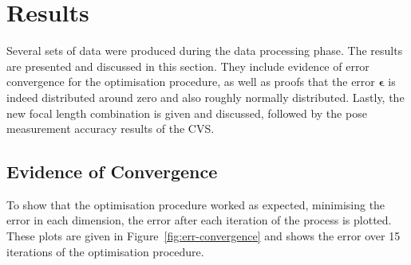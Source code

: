 \section{Results}

Several sets of data were produced during the data processing phase. The results are presented and discussed in this section. They include evidence of error convergence for the optimisation procedure, as well as proofs that the error $\bm{\epsilon}$ is indeed distributed around zero and also roughly normally distributed. Lastly, the new focal length combination is given and discussed, followed by the pose measurement accuracy results of the CVS. 

\subsection{Evidence of Convergence}

To show that the optimisation procedure worked as expected, minimising the error in each dimension, the error after each iteration of the process is plotted. These plots are given in Figure~\ref{fig:err-convergence} and shows the error over 15 iterations of the optimisation procedure.  


